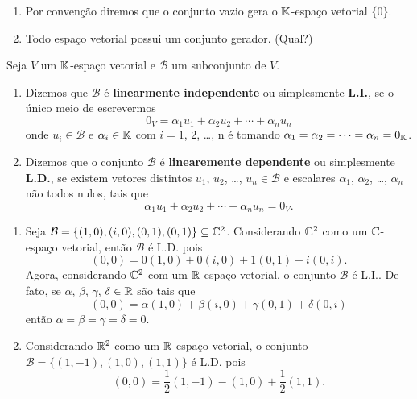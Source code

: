 \begin{observacao}
	\begin{enumerate}\label{conjuntogerador}
		\item Por conven\c{c}\~ao diremos que o conjunto vazio gera o $\mathbb{K}$-espa\c{c}o vetorial $\{0\}$.\label{geradorconjuntonulo}
		\item Todo espa\c{c}o vetorial possui um conjunto gerador. (Qual?)
	\end{enumerate}
\end{observacao}

\begin{definicao}
	Seja $V$ um $\mathbb{K}$-espa\c{c}o vetorial e $\mathcal{B}$ um subconjunto de $V$.
	\begin{enumerate}[label={\roman*})]
		\item Dizemos que $\mathcal{B}$ \'e \textbf{linearmente independente} ou simplesmente \textbf{L.I.}, se o \'unico meio de escrevermos
		\[
			0_V = \alpha_1 u_1 + \alpha_2 u_2 + \cdots + \alpha_n u_n
		\]
		onde $u_i \in \mathcal{B}$ e $\alpha_i \in \mathbb{K}$ com $i = 1$, 2, \dots, n \'e tomando $\alpha_1 = \alpha_2 = \cdots = \alpha_n = 0_{\mathbb{K}}$.
		
		\item Dizemos que o conjunto $\mathcal{B}$ \'e \textbf{linearemente dependente} ou simplesmente 
		\textbf{L.D.}, se existem vetores distintos $u_1$, $u_2$, \dots, $u_n \in \mathcal{B}$ e escalares $\alpha_1$, $\alpha_2$, \dots, $\alpha_n$ n\~ao todos nulos, tais que
		\[
			\alpha_1 u_1 + \alpha_2 u_2 + \cdots + \alpha_n u_n = 0_V.
		\]
	\end{enumerate}
\end{definicao}

\begin{exemplo}
	\begin{enumerate}[label={\arabic*})]
		\item Seja $\mathcal{B} = \{(1, 0), (i, 0), (0, 1), (0, 1)\}\subseteq \mathbb{C}^2$. Considerando $\mathbb{C}^2$ como um $\mathbb{C}$-espa\c{c}o vetorial, ent\~ao $\mathcal{B}$ \'e L.D. pois
		\[
			(0, 0) = 0(1, 0) + 0(i, 0) + 1(0, 1) + i(0, i).
		\]
		Agora, considerando $\mathbb{C}^2$ com um $\mathbb{R}$-espa\c{c}o vetorial, o conjunto $\mathcal{B}$ \'e L.I.. De fato, se $\alpha$, $\beta$, $\gamma$, $\delta \in \mathbb{R}$ s\~ao tais que
		\[
			(0, 0 ) = \alpha(1, 0) + \beta(i, 0) + \gamma(0, 1) + \delta(0, i)
		\]
		ent\~ao $\alpha = \beta = \gamma = \delta = 0$.
		\item Considerando $\mathbb{R}^2$ como um $\mathbb{R}$-espa\c{c}o vetorial, o conjunto $\mathcal{B} = \{(1, -1), (1, 0), (1, 1)\}$ \'e L.D. pois
		\[
			(0, 0 ) = \dfrac{1}{2}(1, -1) - (1, 0) + \dfrac{1}{2}(1, 1).
		\]
	\end{enumerate}
\end{exemplo}

